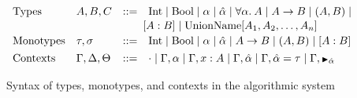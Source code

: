 \begin{figure}[h]
  \centering
%
  \[
      \begin{array}{llcl}
      \text{Types} & A, B, C & \bnfas &
            \Inttype \bnfalt \Booltype \bnfalt \alpha \bnfalt \ahat \bnfalt \alltype{\alpha}{A} \bnfalt A \arr B \bnfalt (A, B) \bnfalt 
            \\[1pt] &&&\!\!\!
            \TypeAlias{A}{B} \bnfalt \Unionname[A_1, A_2, \dots, A_n]
      \\[2pt]
      \text{Monotypes} & \tau,\sigma & \bnfas &
            \Inttype \bnfalt \Booltype \bnfalt \alpha \bnfalt \ahat \bnfalt A \arr B \bnfalt (A, B) \bnfalt \TypeAlias{A}{B}
        \\[4pt]
      \text{Contexts} & \Gamma, \Delta, \Theta & \bnfas &
                  \cdot
                  \bnfalt \Gamma, \alpha 
                  \bnfalt \Gamma, x:A
                  \bnfalt \Gamma, \ahat
                  \bnfalt \Gamma, \hypeq{\ahat}{\tau}
                  \bnfalt \Gamma, \MonnierComma{\ahat}
      \end{array}
  \]
  
  \caption{Syntax of types, monotypes, and contexts in the algorithmic system}
\end{figure}
